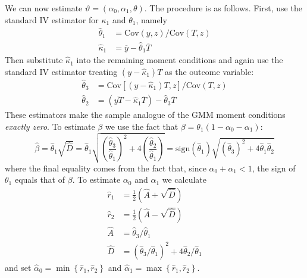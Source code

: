 \documentclass[12pt]{article}
\begin{document}
We can now estimate $\vartheta = (\alpha_0, \alpha_1, \theta)$.
The procedure is as follows.
First, use the standard IV estimator for $\kappa_1$ and $\theta_1$, namely
\begin{align*}
  \widehat{\theta}_1 &= \mbox{Cov}(y,z)/\mbox{Cov}(T,z)\\
  \widehat{\kappa}_1 &= \overline{y} - \widehat{\theta}_1 \overline{T}
\end{align*}
Then substitute $\widehat{\kappa}_1$ into the remaining moment conditions and again use the standard IV estimator treating $(y - \widehat{\kappa}_1)T$ as the outcome variable:
\begin{align*}
  \widehat{\theta}_3 &= \mbox{Cov}\left[ (y-\widehat{\kappa}_1)T, z \right]/ \mbox{Cov}(T, z)\\
  \widehat{\theta}_2 &= (\overline{yT} - \widehat{\kappa}_1 \overline{T}) - \widehat{\theta}_3 \overline{T}  
\end{align*}
These estimators make the sample analogue of the GMM moment conditions \emph{exactly zero}.
To estimate $\beta$ we use the fact that $\beta = \theta_1 (1 - \alpha_0 - \alpha_1)$:
\[
  \widehat{\beta} =  \widehat{\theta}_1 \sqrt{\widehat{D}} = \widehat{\theta}_1 \sqrt{\left( \frac{\widehat{\theta}_3}{\widehat{\theta}_1} \right)^2 + 4 \left( \frac{\widehat{\theta}_2}{\widehat{\theta}_1} \right)} = \mbox{sign}(\widehat{\theta}_1) \sqrt{\left(\widehat{\theta}_3\right)^2 +4 \widehat{\theta}_1 \widehat{\theta}_2}
\]
where the final equality comes from the fact that, since $\alpha_0 + \alpha_1 < 1$, the sign of $\theta_1$ equals that of $\beta$.
To estimate $\alpha_0$ and $\alpha_1$ we calculate
\begin{align*}
  \widehat{r}_1 &= \frac{1}{2}\left( \widehat{A} + \sqrt{\widehat{D}} \right)\\
  \widehat{r}_2 &= \frac{1}{2}\left( \widehat{A} - \sqrt{\widehat{D}} \right)\\
  \widehat{A} &= \widehat{\theta}_3 / \widehat{\theta}_1\\
  \widehat{D} &= (\widehat{\theta}_3 / \widehat{\theta}_1)^2 + 4\widehat{\theta}_2/\widehat{\theta}_1
\end{align*}
and set $\widehat{\alpha}_0 = \min\left\{ \widehat{r}_1, \widehat{r}_2 \right\}$ and $\widehat{\alpha}_1 = \max\left\{ \widehat{r}_1, \widehat{r}_2 \right\}$.
\end{document}
